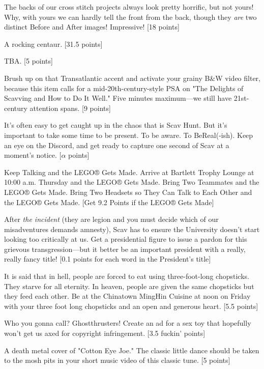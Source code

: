 \documentclass{book}
\begin{document}
\begin{list}{}{}
\item The backs of our cross stitch projects always look pretty horrific, but not yours! Why, with yours we can hardly tell the front from the back, though they \textit{are} two distinct Before and After images! Impressive! [18 points]
\item A rocking centaur. [31.5 points]
\item TBA. [5 points] %
\item Brush up on that Transatlantic accent and activate your grainy B\&W video filter, because this item calls for a mid-20th-century-style PSA on "The Delights of Scavving and How to Do It Well." Five minutes maximum---we still have 21st-century attention spans. [9 points] \textleaf
\item It’s often easy to get caught up in the chaos that is Scav Hunt. But it’s important to take some time to be present. To be aware. To BeReal(-ish). Keep an eye on the Discord, and get ready to capture one second of Scav at a moment’s notice. [$\alpha$ points]
\item Keep Talking and the LEGO® Gets Made. Arrive at Bartlett Trophy Lounge at 10:00 a.m. Thursday and the LEGO® Gets Made. Bring Two Teammates and the LEGO® Gets Made. Bring Two Headsets so They Can Talk to Each Other and the LEGO® Gets Made. [Get 9.2 Points if the LEGO® Gets Made]
\newpage
\item After \textit{the incident} (they are legion and you must decide which of our misadventures demands amnesty), Scav has to ensure the University doesn’t start looking too critically at us. Get a presidential figure to issue a pardon for this grievous transgression---but it better be an important president with a really, really fancy title! [0.1 points for each word in the President’s title]
\item It is said that in hell, people are forced to eat using three-foot-long chopsticks. They starve for all eternity. In heaven, people are given the same chopsticks but they feed each other. Be at the Chinatown MingHin Cuisine at noon on Friday with your three foot long chopsticks and an open and generous heart. [5.5 points]
\item Who you gonna call? Ghostthrusters! Create an ad for a sex toy that hopefully won’t get us axed for copyright infringement. [3.5 fuckin' points]
\item A death metal cover of "Cotton Eye Joe." The classic little dance should be taken to the mosh pits in your short music video of this classic tune. [5 points]

\end{list}
\end{document}
